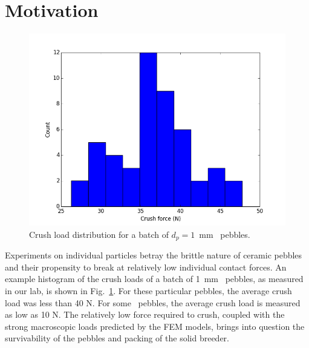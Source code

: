 \section{Motivation}\label{sec:motivation}

\begin{figure}[ht]
	\centering
	\includegraphics[width=\singleimagewidth]{chapters/figures/fmax} 
	\caption{Crush load distribution for a batch of $d_p = 1$~mm \lit~pebbles.}
	\label{fig:fmax}
\end{figure}


Experiments on individual particles betray the brittle nature of ceramic pebbles and their propensity to break at relatively low individual contact forces. An example histogram of the crush loads of a batch of 1~mm \lit~pebbles, as measured in our lab, is shown in Fig.~\ref{fig:fmax}. For these particular pebbles, the average crush load was less than 40 N. For some \lis~pebbles, the average crush load is measured as low as 10 N. The relatively low force required to crush, coupled with the strong macroscopic loads predicted by the FEM models, brings into question the survivability of the pebbles and packing of the solid breeder.

